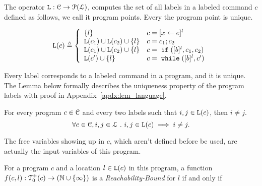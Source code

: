 The operator $\mathtt{L}: \mathcal{C} \to \mathcal{P}(\mathcal{L})$,
computes the set of all labels
in a labeled command $c$ defined as follows, we call it program points.
Every the program point is unique.
\begin{defn}
\label{def:lvar}
{\small
$$
  \lvar(c) \triangleq
  \left\{
  \begin{array}{ll}
      \{l\}                  
      & {c} = [{\assign x e}]^{l} 
      \\
      \lvar({c_1}) \cup \lvar({{c_2}})  \cup \{l\} 
      & {c} = {c_1};{c_2}
      \\
      \lvar(c_1) \cup \lvar({{c_2}}) \cup \{l\} 
      & {c} =\eif([\bexpr]^{l}, c_1, c_2) 
      \\
      \lvar({{c}'}) \cup \{l\} 
      & {c}   = \ewhile ([\bexpr]^{l}, {c}')
\end{array}
\right.
$$
}
\end{defn}
%
Every label corresponds to a labeled command in a program, and it is unique.
The Lemma below formally describes the uniqueness property of the program labels
with proof in Appendix~\ref{apdx:lem_language}.
\begin{lem}
  \label{lem:label_unique}
  For every program $c \in \mathcal{C}$ and every two labels such that
  $i, j \in \mathtt{L}(c)$, then $i \neq j$.
  \[
    \forall c \in \mathcal{C}, i, j \in \mathcal{L} ~.~ i, j \in \mathtt{L}(c)\implies i \neq j.
    \]
\end{lem}
%
The free variables
showing up in $c$, which aren't defined before be used, are actually the input variables of this program.
%
\begin{defn}
  \label{def:rb}
  For a program ${c}$ and a location $l \in \mathtt{L}(c)$ in this program,
a function $f(c, l) : \mathcal{T}^{+}_0(c) \to (\mathbb{N} \cup \{\infty\})$ is a \emph{Reachability-Bound} for $l$ if and only if
\end{defn}
